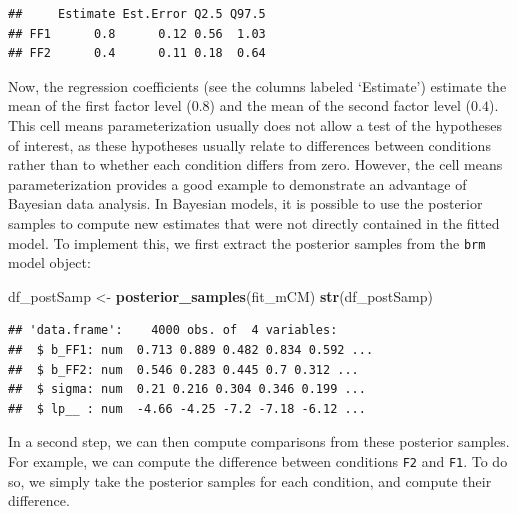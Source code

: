 \documentclass[12pt,]{krantz}
\newenvironment{Shaded}{\begin{snugshade}}{\end{snugshade}}
\newcommand{\KeywordTok}[1]{\textcolor[rgb]{0.13,0.29,0.53}{\textbf{#1}}}
\newcommand{\NormalTok}[1]{#1}
\newcommand{\OperatorTok}[1]{\textcolor[rgb]{0.81,0.36,0.00}{\textbf{#1}}}
\newcommand{\StringTok}[1]{\textcolor[rgb]{0.31,0.60,0.02}{#1}}
\theoremstyle{definition}
\theoremstyle{definition}
\theoremstyle{definition}
\theoremstyle{remark}
\begin{document}
\begin{verbatim}
##     Estimate Est.Error Q2.5 Q97.5
## FF1      0.8      0.12 0.56  1.03
## FF2      0.4      0.11 0.18  0.64
\end{verbatim}

Now, the regression coefficients (see the columns labeled `Estimate') estimate the mean of the first factor level (\(0.8\)) and the mean of the second factor level (\(0.4\)). This cell means parameterization usually does not allow a test of the hypotheses of interest, as these hypotheses usually relate to differences between conditions rather than to whether each condition differs from zero.
However, the cell means parameterization provides a good example to demonstrate an advantage of Bayesian data analysis. In Bayesian models, it is possible to use the posterior samples to compute new estimates that were not directly contained in the fitted model. To implement this, we first extract the posterior samples from the \texttt{brm} model object:

\begin{Shaded}
\begin{Highlighting}[]
\NormalTok{df_postSamp <-}\StringTok{ }\KeywordTok{posterior_samples}\NormalTok{(fit_mCM)}
\KeywordTok{str}\NormalTok{(df_postSamp)}
\end{Highlighting}
\end{Shaded}

\begin{verbatim}
## 'data.frame':    4000 obs. of  4 variables:
##  $ b_FF1: num  0.713 0.889 0.482 0.834 0.592 ...
##  $ b_FF2: num  0.546 0.283 0.445 0.7 0.312 ...
##  $ sigma: num  0.21 0.216 0.304 0.346 0.199 ...
##  $ lp__ : num  -4.66 -4.25 -7.2 -7.18 -6.12 ...
\end{verbatim}

In a second step, we can then compute comparisons from these posterior samples. For example, we can compute the difference between conditions \texttt{F2} and \texttt{F1}. To do so, we simply take the posterior samples for each condition, and compute their difference.

\begin{Shaded}
\end{Shaded}
\end{document}

